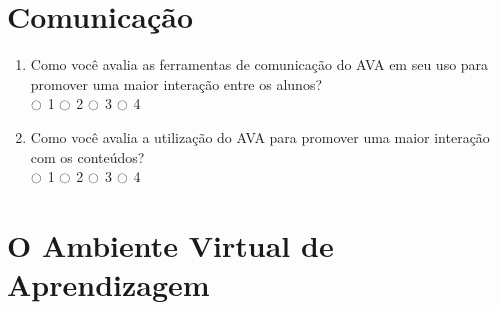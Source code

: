 \section{Comunicação}

\begin{enumerate}
  \item Como você avalia as ferramentas de comunicação do AVA em seu uso para promover uma maior interação entre os alunos? \\
  $\ocircle$ 1  $\ocircle$ 2 $\ocircle$ 3 $\ocircle$ 4

  \item Como você avalia a utilização do AVA para promover uma maior interação com os conteúdos? \\
  $\ocircle$ 1  $\ocircle$ 2 $\ocircle$ 3 $\ocircle$ 4
\end{enumerate}

\section{O Ambiente Virtual de Aprendizagem}

